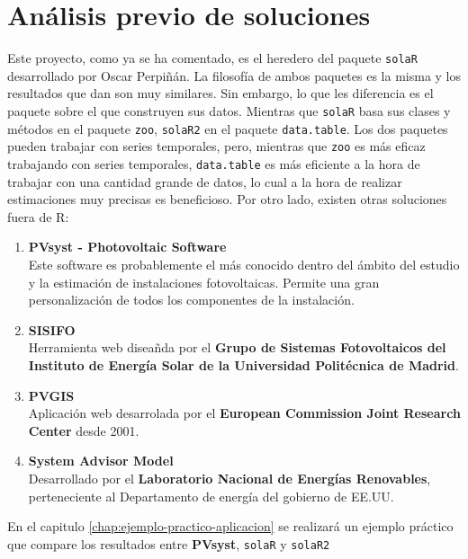 \section{Análisis previo de soluciones}
\label{sec:org908eb30}
Este proyecto, como ya se ha comentado, es el heredero del paquete \texttt{solaR} desarrollado por Oscar Perpiñán. La filosofía de ambos paquetes es la misma y los resultados que dan son muy similares. Sin embargo, lo que les diferencia es el paquete sobre el que construyen sus datos.
Mientras que \texttt{solaR} basa sus clases y métodos en el paquete \texttt{zoo}, \texttt{solaR2} en el paquete \texttt{data.table}. Los dos paquetes pueden trabajar con series temporales, pero, mientras que \texttt{zoo} es más eficaz trabajando con series temporales, \texttt{data.table} es más eficiente a la hora de trabajar con una cantidad grande de datos, lo cual a la hora de realizar estimaciones muy precisas es beneficioso.
Por otro lado, existen otras soluciones fuera de R:
\begin{enumerate}
\item \textbf{PVsyst - Photovoltaic Software}\\[0pt]
Este software es probablemente el más conocido dentro del ámbito del estudio y la estimación de instalaciones fotovoltaicas. Permite una gran personalización de todos los componentes de la instalación.
\item \textbf{SISIFO}\\[0pt]
Herramienta web diseañda por el \textbf{Grupo de Sistemas Fotovoltaicos del Instituto de Energía Solar de la Universidad Politécnica de Madrid}.
\item \textbf{PVGIS}\\[0pt]
Aplicación web desarrolada por el \textbf{European Commission Joint Research Center} desde 2001.
\item \textbf{System Advisor Model}\\[0pt]
Desarrollado por el \textbf{Laboratorio Nacional de Energías Renovables}, perteneciente al Departamento de energía del gobierno de EE.UU.
\end{enumerate}
En el capitulo \ref{chap:ejemplo-practico-aplicacion} se realizará un ejemplo práctico que compare los resultados entre \textbf{PVsyst}, \texttt{solaR} y \texttt{solaR2}
